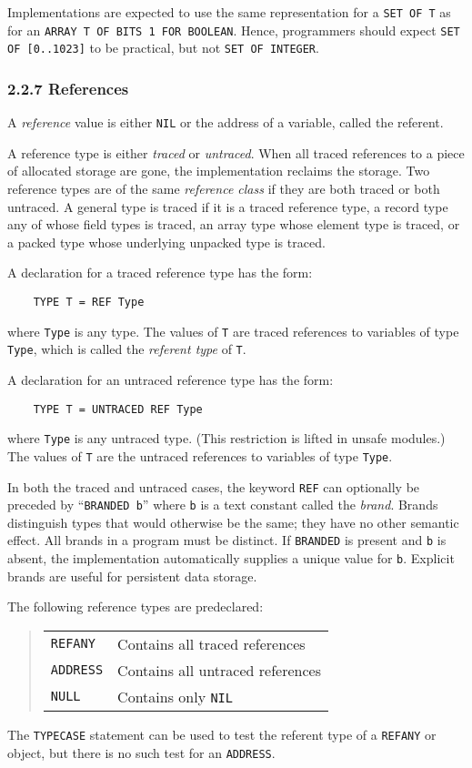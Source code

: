 \documentclass[10pt]{article}
\begin{document}
Implementations are expected to use the same representation for a
\verb|SET OF T| as for an \verb|ARRAY T OF BITS 1 FOR BOOLEAN|.  Hence,
programmers should expect \verb|SET OF [0..1023]| to be practical, but not
\verb|SET OF INTEGER|.

\subsubsection*{2.2.7 References}

A \emph{reference} value is either \verb|NIL| or the address of a variable,
called the referent.

A reference type is either \emph{traced} or \emph{untraced}.  When all traced
references to a piece of allocated storage are gone, the implementation
reclaims the storage.  Two reference types are of the same \emph{reference
  class} if they are both traced or both untraced.  A general type is traced
if it is a traced reference type, a record type any of whose field types is
traced, an array type whose element type is traced, or a packed type whose
underlying unpacked type is traced.

A declaration for a traced reference type has the form:
\begin{verbatim}
    TYPE T = REF Type
\end{verbatim}
where \verb|Type| is any type.  The values of \verb|T| are traced references
to variables of type \verb|Type|, which is called the \emph{referent type} of
\verb|T|.

A declaration for an untraced reference type has the form:
\begin{verbatim}
    TYPE T = UNTRACED REF Type
\end{verbatim}
where \verb|Type| is any untraced type.  (This restriction is lifted in unsafe
modules.) The values of \verb|T| are the untraced references to variables of
type \verb|Type|.

In both the traced and untraced cases, the keyword \verb|REF| can optionally
be preceded by ``\verb|BRANDED b|'' where \verb|b| is a text constant called
the \emph{brand}.  Brands distinguish types that would otherwise be the same;
they have no other semantic effect.  All brands in a program must be distinct.
If \verb|BRANDED| is present and \verb|b| is absent, the implementation
automatically supplies a unique value for \verb|b|.  Explicit brands are
useful for persistent data storage.

The following reference types are predeclared:
\begin{quote}
  \begin{tabular}{ll}
    \verb|REFANY|  & Contains all traced references \\
    \verb|ADDRESS| & Contains all untraced references \\
    \verb|NULL|    & Contains only \verb|NIL| \\
  \end{tabular}
\end{quote}
The \verb|TYPECASE| statement can be used to test the referent type of a
\verb|REFANY| or object, but there is no such test for an \verb|ADDRESS|.
\end{document}
